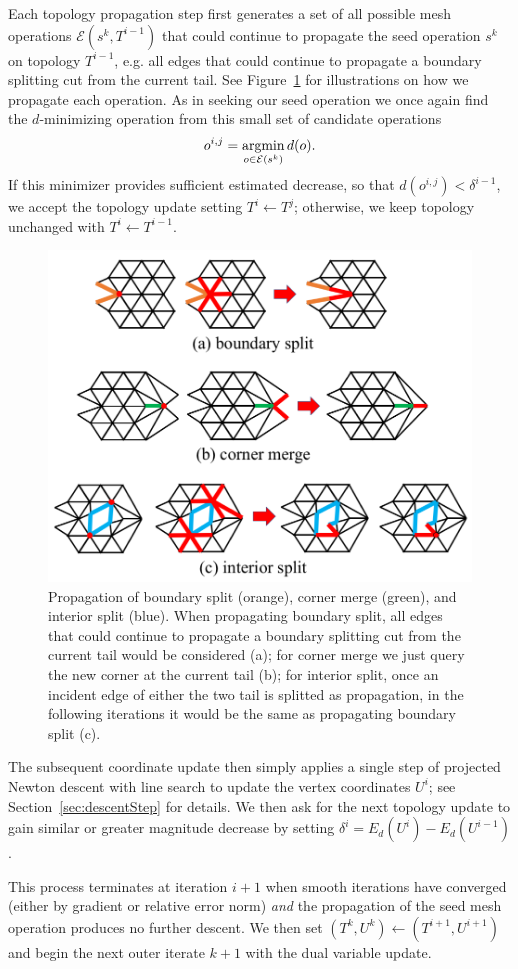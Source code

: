 Each topology propagation step first generates a set of all possible mesh operations $\mathcal{E}(s^k, T^{i-1})$ that could continue to propagate the seed operation $s^k$ on topology $T^{i-1}$, e.g. all edges that could continue to propagate a boundary splitting cut from the current tail. See Figure\ \ref{fig:propagation} for illustrations on how we propagate each operation.
As in seeking our seed operation we once again find the $d$-minimizing operation from this small set of candidate operations
\begin{align}
\label{eq:minE}
o^{i,j} = \operatorname*{argmin}_{o \in \mathcal{E}(s^k)} d(o).
\end{align}
If this minimizer provides sufficient estimated decrease, so that $d(o^{i,j}) < \delta^{i-1}$, we accept the topology update setting $T^i \leftarrow T^j$; otherwise, we keep topology unchanged with $T^i \leftarrow T^{i-1}.$

\begin{figure}[t]
\centering
\includegraphics[width=0.8\linewidth]{fig/propagation.png}
\caption{Propagation of boundary split (orange), corner merge (green), and interior split (blue). When propagating boundary split, all edges that could continue to propagate a boundary splitting cut from the current tail would be considered (a); for corner merge we just query the new corner at the current tail (b); for interior split, once an incident edge of either the two tail is splitted as propagation, in the following iterations it would be the same as propagating boundary split (c).
 }
\label{fig:propagation}
\end{figure}

The subsequent coordinate update then simply applies a single step of projected Newton descent with line search to update the vertex coordinates $U^i$; see Section~\ref{sec:descentStep} for details. We then ask for the next topology update to gain similar or greater magnitude decrease by setting $\delta^i = E_d(U^i) - E_d(U^{i-1})$.

This process terminates at iteration $i+1$ when smooth iterations have converged (either by gradient or relative error norm) \emph{and} the propagation of the seed mesh operation produces no further descent. We then set $(T^k,U^k) \leftarrow (T^{i+1},U^{i+1})$ and begin the next outer iterate $k+1$ with the dual variable update. 


